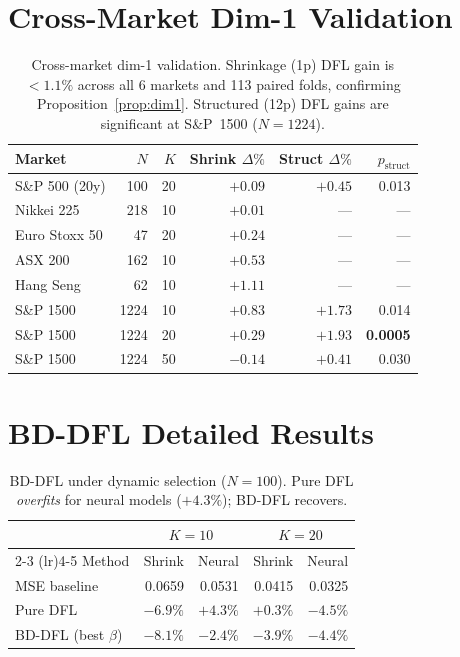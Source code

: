 \documentclass[letterpaper]{article}
\begin{document}
\section{Cross-Market Dim-1 Validation}
\label{app:ftse}

\begin{table}[h]
\centering
\caption{Cross-market dim-1 validation. Shrinkage (1p) DFL gain is $< 1.1\%$ across all 6 markets and 113 paired folds, confirming Proposition~\ref{prop:dim1}. Structured (12p) DFL gains are significant at S\&P~1500 ($N{=}1224$).}
\label{tab:crossmarket}
\small
\begin{tabular}{@{}lrrrrr@{}}
\toprule
Market & $N$ & $K$ & Shrink $\Delta\%$ & Struct $\Delta\%$ & $p_{\text{struct}}$ \\
\midrule
S\&P 500 (20y) & 100 & 20 & $+0.09$ & $+0.45$ & 0.013 \\
Nikkei 225 & 218 & 10 & $+0.01$ & --- & --- \\
Euro Stoxx 50 & 47 & 20 & $+0.24$ & --- & --- \\
ASX 200 & 162 & 10 & $+0.53$ & --- & --- \\
Hang Seng & 62 & 10 & $+1.11$ & --- & --- \\
S\&P 1500 & 1224 & 10 & $+0.83$ & $+1.73$ & 0.014 \\
S\&P 1500 & 1224 & 20 & $+0.29$ & \textbf{$+1.93$} & \textbf{0.0005} \\
S\&P 1500 & 1224 & 50 & $-0.14$ & $+0.41$ & 0.030 \\
\bottomrule
\end{tabular}
\end{table}

\section{BD-DFL Detailed Results}
\label{app:bddfl_detail}

\begin{table}[h]
\centering
\caption{BD-DFL under dynamic selection ($N{=}100$). Pure DFL \emph{overfits} for neural models ($+4.3\%$); BD-DFL recovers.}
\small
\begin{tabular}{@{}lrrrr@{}}
\toprule
 & \multicolumn{2}{c}{$K{=}10$} & \multicolumn{2}{c}{$K{=}20$} \\
\cmidrule(lr){2-3} \cmidrule(lr){4-5}
Method & Shrink & Neural & Shrink & Neural \\
\midrule
MSE baseline       & 0.0659 & 0.0531 & 0.0415 & 0.0325 \\
Pure DFL           & $-6.9\%$ & $+4.3\%$ & $+0.3\%$ & $-4.5\%$ \\
BD-DFL (best $\beta$) & $-8.1\%$ & $-2.4\%$ & $-3.9\%$ & $-4.4\%$ \\
\bottomrule
\end{tabular}
\end{table}
\end{document}
